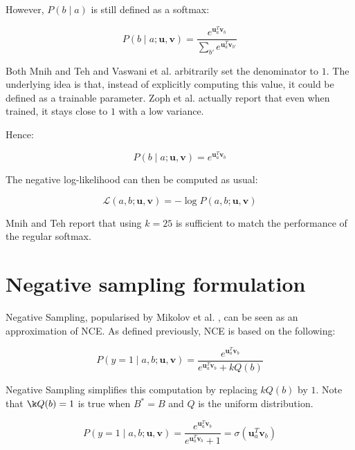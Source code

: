 \documentclass[a4paper,oneside,12pt]{article}
\begin{document}
However, $P(b \mid a)$ is still defined as a softmax:

\begin{equation}
P(b \mid a ; \mathbf{u}, \mathbf{v}) = \frac{e^{\mathbf{u}_a^T \mathbf{v}_b}}{\sum_{b'} e^{\mathbf{u}_a^T \mathbf{v}_{b'}}}
\end{equation}

Both Mnih and Teh \cite{mnih2012fast} and Vaswani et al. \cite{vaswani-etal-2013-decoding} arbitrarily set the denominator to $1$.
The underlying idea is that, instead of explicitly computing this value, it could be defined as a trainable parameter.
Zoph et al. \cite{zoph-fast} actually report that even when trained, it stays close to $1$ with a low variance.

Hence:

\begin{equation}
P(b \mid a ; \mathbf{u}, \mathbf{v}) = e^{\mathbf{u}_a^T \mathbf{v}_b}
\end{equation}

The negative log-likelihood can then be computed as usual:

\begin{equation}
\mathcal{L} (a, b ; \mathbf{u}, \mathbf{v}) = -\log P (a, b ; \mathbf{u}, \mathbf{v})
\end{equation}

Mnih and Teh \cite{mnih2012fast} report that using $k = 25$ is sufficient to match the performance of the regular softmax.


\section{Negative sampling formulation}

Negative Sampling, popularised by Mikolov et al. \cite{Mikolov2013DistributedRO}, can be seen as an approximation of NCE.
As defined previously, NCE is based on the following:

\begin{equation}
P(y = 1 \mid a, b ; \mathbf{u}, \mathbf{v}) = \frac{e^{\mathbf{u}_a^T \mathbf{v}_b}}{e^{\mathbf{u}_a^T \mathbf{v}_b} + k Q(b)}
\end{equation}

Negative Sampling simplifies this computation by replacing $k Q(b)$ by $1$.
Note that $\k Q(b) = 1$ is true when $B^* = B$ and $Q$ is the uniform distribution.

\begin{equation}
P(y = 1 \mid a, b ; \mathbf{u}, \mathbf{v}) = \frac{e^{\mathbf{u}_a^T \mathbf{v}_b}}{e^{\mathbf{u}_a^T \mathbf{v}_b} + 1} = \sigma \left( \mathbf{u}_a^T \mathbf{v}_b \right)
\end{equation}
\end{document}
